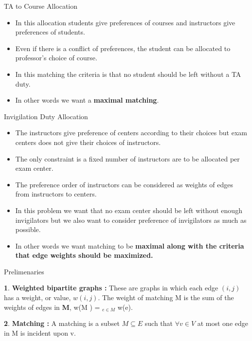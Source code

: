 \documentclass[11pt]{beamer}
\theoremstyle{definition}
\newtheorem{defn}{}%
\begin{document}
\begin{frame}{TA to Course Allocation }
\begin{itemize}


\item In this allocation students give preferences of courses and instructors give preferences of students.
\item Even if there is a conflict of preferences, the student can be allocated to professor's choice of course.
\item In this matching the criteria is that no student should be left without a TA duty.
\item In other words we want a \textbf{maximal matching}.
\end{itemize}
\end{frame}

\begin{frame}{Invigilation Duty Allocation}
\begin{itemize}
\item The instructors give preference of centers according to their choices but exam centers does not give their choices of instructors.
\item The only constraint is a fixed number of instructors are to be allocated per exam center.           
\item The preference order of instructors can be considered as weights of edges from instructors to centers.
\item In this problem we want that no exam center should be left without enough invigilators but we also want to consider preference of invigilators as much as possible.
\item In other words we want matching to be \textbf{maximal along with the criteria that edge weights should be maximized.}
\end{itemize}
\end{frame}



\begin{frame}{Prelimenaries}

\begin{defn}{\textbf{Weighted bipartite graphs :}}
These are graphs in which each edge $(i, j)$ has a weight, or value, $w(i, j)$. The weight of matching M is the sum of the weights of edges in \textbf{M}, w(M ) = $_{e \in M}$ w(e).
\end{defn}
\begin{defn}{\textbf{Matching :}}
A matching is a subset $M \subseteq E $ such that $\forall v \in V$ at most one edge in M is incident upon v.
\end{defn}

\end{frame}
\end{document}
